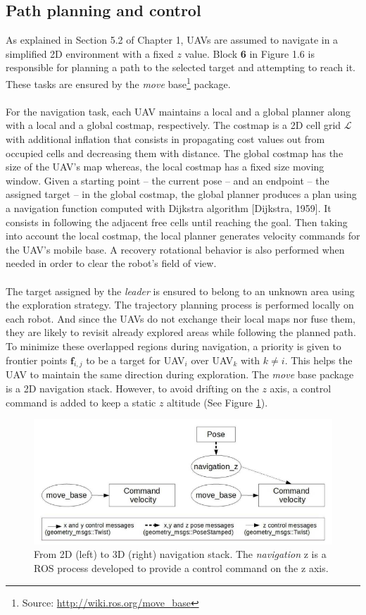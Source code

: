 \documentclass[11pt,openany]{book}
\begin{document}
\subsection{Path planning and control}
As explained in Section 5.2 of Chapter 1, UAVs are assumed to navigate in a simpliﬁed 2D environment with a ﬁxed $z$ value. Block \textbf{6} in Figure 1.6 is responsible for planning a path to the selected target and attempting to reach it. These tasks are ensured by the \textit{move} base\footnote{Source: \url{http://wiki.ros.org/move_base}} package.\\\\
For the navigation task, each UAV maintains a local and a global planner along with a local and a global costmap, respectively. The costmap is a 2D cell grid $\mathcal{L}$ with additional inﬂation that consists in propagating cost values out from occupied cells and decreasing them with distance. The global costmap has the size of the UAV’s map whereas, the local costmap has a ﬁxed size moving window. Given a starting point – the current pose – and an endpoint – the assigned target – in the global costmap, the global planner produces a plan using a navigation function computed with Dijkstra algorithm [Dijkstra, 1959]. It consists in following the adjacent free cells until reaching the goal. Then taking into account the local costmap, the local planner generates velocity commands for the UAV’s mobile base. A recovery rotational behavior is also performed when needed in order to clear the robot’s ﬁeld of view.\\\\
The target assigned by the \textit{leader} is ensured to belong to an unknown area using the exploration strategy. The trajectory planning process is performed locally on each robot. And since the UAVs do not exchange their local maps nor fuse them, they are likely to revisit already explored areas while following the planned path. To minimize these overlapped regions during navigation, a priority is given to frontier points $\mathbf{f}_{i,j}$ to be a target for UAV$_i$ over UAV$_k$ with $k \neq i$. This helps the UAV to maintain the same direction during exploration. The \textit{move} base package is a 2D navigation stack. However, to avoid drifting on the $z$ axis, a control command is added to keep a static $z$ altitude (See Figure \ref{fig:3.10}).
\begin{figure}[H]
    \centering
    \includegraphics[scale=0.4]{assets/3_10.png}
    \caption{From 2D (left) to 3D (right) navigation stack. The \textit{navigation} z is a ROS process developed to provide a control command on the z axis.}
    \label{fig:3.10}
\end{figure}
\end{document}
